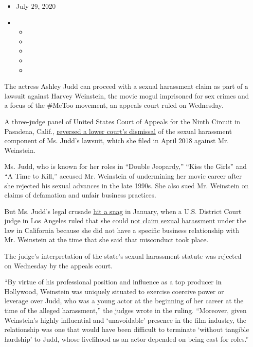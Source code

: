 \begin{itemize}
\item
  July 29, 2020
\item
  \begin{itemize}
  \item
  \item
  \item
  \item
  \item
  \end{itemize}
\end{itemize}

The actress Ashley Judd can proceed with a sexual harassment claim as
part of a lawsuit against Harvey Weinstein, the movie mogul imprisoned
for sex crimes and a focus of the \#MeToo movement, an appeals court
ruled on Wednesday.

A three-judge panel of United States Court of Appeals for the Ninth
Circuit in Pasadena, Calif.,
\href{https://cdn.ca9.uscourts.gov/datastore/opinions/2020/07/29/19-55499.pdf}{reversed
a lower court's dismissal} of the sexual harassment component of Ms.
Judd's lawsuit, which she filed in April 2018 against Mr. Weinstein.

Ms. Judd, who is known for her roles in ``Double Jeopardy,'' ``Kiss the
Girls'' and ``A Time to Kill,'' accused Mr. Weinstein of undermining her
movie career after she rejected his sexual advances in the late 1990s.
She also sued Mr. Weinstein on claims of defamation and unfair business
practices.

But Ms. Judd's legal crusade
\href{https://www.nytimes.com/2019/01/09/business/media/ashley-judd-lawsuit-harvey-weinstein.html}{hit
a snag} in January, when a U.S. District Court judge in Los Angeles
ruled that she could
\href{https://www.hollywoodreporter.com/thr-esq/judge-lets-ashley-judd-sue-harvey-weinstein-defamation-not-sexual-harassment-1145409}{not
claim sexual harassment} under the law in California because she did not
have a specific business relationship with Mr. Weinstein at the time
that she said that misconduct took place.

The judge's interpretation of the state's sexual harassment statute was
rejected on Wednesday by the appeals court.

``By virtue of his professional position and influence as a top producer
in Hollywood, Weinstein was uniquely situated to exercise coercive power
or leverage over Judd, who was a young actor at the beginning of her
career at the time of the alleged harassment,'' the judges wrote in the
ruling. ``Moreover, given Weinstein's highly influential and
`unavoidable' presence in the film industry, the relationship was one
that would have been difficult to terminate `without tangible hardship'
to Judd, whose livelihood as an actor depended on being cast for
roles.''

